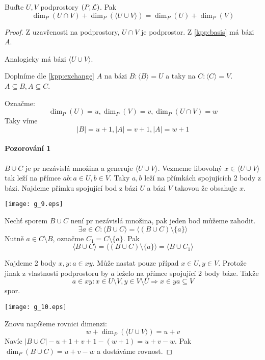 \begin{theorem}
    Buďte $U,V$ podprostory $(P,\operatorname{\mathcal{L}})$.
    Pak
    \[ \dim_P(U \cap V) + \dim_P(\langle U \cup V \rangle) = \dim_P(U)+\dim_P(V) \]
\end{theorem}
\begin{proof}
	Z uzavřenosti na podprostory, $U \cap V$ je podprostor.
	Z \cref{kpp:basis} má bázi $A$.

	Analogicky má bázi $\langle U \cup V \rangle$.

	Doplníme dle \cref{kpp:exchange} $A$ na bázi $B: \langle B \rangle = U$ a taky na $C: \langle C \rangle = V$.
	$ A \subseteq B, A \subseteq C$.

	Označme:
	\[ \dim_P (U) = u, \dim_P (V) = v, \dim_P (U \cap V) = w \]
	Taky víme
	\[ |B| = u + 1, |A| = v + 1, |A| = w + 1 \]
	\paragraph{Pozorování 1} $B \cup C$ je pr nezávislá množina a generuje $\langle U \cup V \rangle$.
	Vezmeme libovolný $x \in \langle U \cup V \rangle$ tak leží na přímce $ab: a \in U, b \in V$.
	Taky $a, b$ leží na přímkách spojujících 2 body z bázi.
	Najdeme přímku spojující bod z bázi $U$ a bázi $V$ takovou že obsahuje $x$.

    	\texttt{[image: g\_9.eps]}

	Nechť sporem $B \cup C$ není pr nezávislá množina, pak jeden bod můžeme zahodit.
	\[ \exists a \in C: \langle B \cup C \rangle = \langle (B \cup C) \setminus \{ a \} \rangle \]
	Nutně $a \in C \setminus B$, označme $C_1 = C \setminus \{ a \}$.
	Pak
	\[ \langle B \cup C \rangle = \langle (B \cup C) \setminus \{ a \} \rangle = \langle B \cup C_1 \rangle \]

	Najdeme 2 body $x, y: a \in xy$.
	Může nastat pouze případ $x \in U, y \in V$.
	Protože jinak z vlastnosti podprostoru by $a$ leželo na přímce spojující 2 body báze.
	Takže
	\[ a \in xy: x \in U \setminus V, y \in V \setminus U \Rightarrow x \in ya \subseteq V \]
	spor.

    	\texttt{[image: g\_10.eps]}

	Znovu napíšeme rovnici dimenzi:
	\[ w + \dim_P(\langle U \cup V \rangle) = u + v \]
	Navíc $|B \cup C| - u + 1 + v + 1 - (w + 1) = u + v - w $.
	Pak $\dim_P (B \cup C) = u + v - w$ a dostáváme rovnost.
\end{proof}

